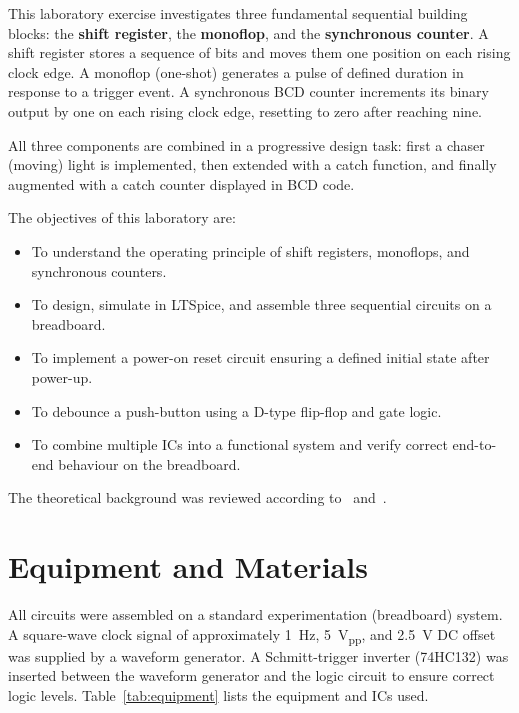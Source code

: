 \documentclass[12pt, a4paper]{article}
\begin{document}
This laboratory exercise investigates three fundamental sequential building blocks:
the \textbf{shift register}, the \textbf{monoflop}, and the \textbf{synchronous
counter}. A shift register stores a sequence of bits and moves them one position on
each rising clock edge. A monoflop (one-shot) generates a pulse of defined duration
in response to a trigger event. A synchronous BCD counter increments its binary
output by one on each rising clock edge, resetting to zero after reaching nine.

All three components are combined in a progressive design task: first a chaser
(moving) light is implemented, then extended with a catch function, and finally
augmented with a catch counter displayed in BCD code.

The objectives of this laboratory are:
\begin{itemize}[leftmargin=1.5em]
  \item To understand the operating principle of shift registers, monoflops, and
        synchronous counters.
  \item To design, simulate in LTSpice, and assemble three sequential circuits on
        a breadboard.
  \item To implement a power-on reset circuit ensuring a defined initial state after
        power-up.
  \item To debounce a push-button using a D-type flip-flop and gate logic.
  \item To combine multiple ICs into a functional system and verify correct
        end-to-end behaviour on the breadboard.
\end{itemize}

The theoretical background was reviewed according to~\cite{Floyd2006}
and~\cite{TietzeSchenk1999}.

\section{Equipment and Materials}

All circuits were assembled on a standard experimentation (breadboard) system.
A square-wave clock signal of approximately \SI{1}{\hertz}, \SI{5}{\volt_{pp}},
and \SI{2.5}{\volt} DC offset was supplied by a waveform generator.
A Schmitt-trigger inverter (74HC132) was inserted between the waveform generator
and the logic circuit to ensure correct logic levels.
Table~\ref{tab:equipment} lists the equipment and ICs used.
\end{document}
